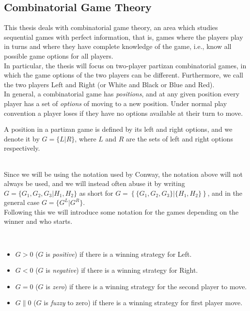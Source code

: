 \subsection{Combinatorial Game Theory}
This thesis deals with combinatorial game theory, an area which studies sequential games with perfect information, that is, games where the players play in turns and where they have complete knowledge of the game, i.e., know all possible game options for all players. 
\\
In particular, the thesis will focus on two-player partizan combinatorial games, in which the game options of the two players can be different. Furthermore, we call the two players Left and Right (or White and Black or Blue and Red).
\\
In general, a combinatorial game has \emph{positions}, and at any given position every player has a set of \emph{options} of moving to a new position. Under normal play convention a player loses if they have no options available at their turn to move.
\begin{defn}
A position in a partizan game is defined by its left and right options, and we denote it by $G=\{L|R\}$, where $L$ and $R$ are the sets of left and right options respectively. 
\end{defn}
~\\
Since we will be using the notation used by Conway\cite{onag}, the notation above will not always be used, and we will instead often abuse it by writing $G=\{G_1,G_2,G_3|H_1,H_2\}$ as short for $G=\left\{\{G_1,G_2,G_3\}|\{H_1,H_2\}\right\}$, and in the general case $G=\{G^L|G^R\}$.
\\
Following this we will introduce some notation for the games depending on the winner and who starts.
\begin{defn}
\label{def:value}
~
\begin{itemize}
\item $G>0$ ($G$ is \emph{positive}) if there is a winning strategy for Left.
\item $G<0$ ($G$ is \emph{negative}) if there is a winning strategy for Right.
\item $G=0$ ($G$ is \emph{zero}) if there is a winning strategy for the second player to move.
\item $G\parallel0$ ($G$ is \emph{fuzzy} to zero) if there is a winning strategy for first player move.
\end{itemize}
\end{defn}
